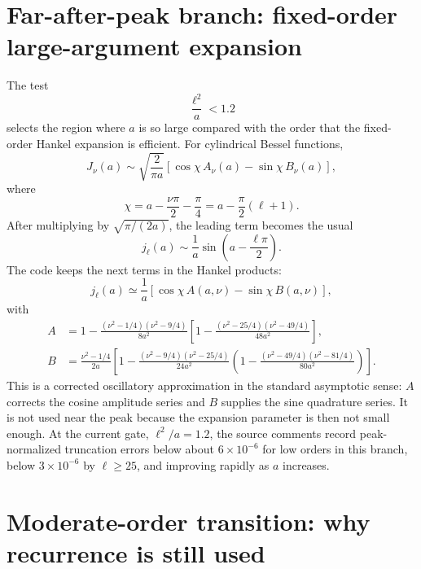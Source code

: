 \documentclass[11pt,a4paper]{article}
\begin{document}
\section{Far-after-peak branch: fixed-order large-argument expansion}

The test
\begin{equation}
  \frac{\ell^2}{a}<1.2
\end{equation}
selects the region where $a$ is so large compared with the order that the fixed-order Hankel expansion is efficient.  For cylindrical Bessel functions,
\begin{equation}
  J_\nu(a)\sim \sqrt{\frac{2}{\pi a}}
  \left[\cos\chi\,A_\nu(a)-\sin\chi\,B_\nu(a)\right],
\end{equation}
where
\begin{equation}
  \chi=a-\frac{\nu\pi}{2}-\frac{\pi}{4}
  = a-\frac{\pi}{2}(\ell+1).
\end{equation}
After multiplying by $\sqrt{\pi/(2a)}$, the leading term becomes the usual
\begin{equation}
  j_\ell(a)\sim \frac{1}{a}\sin\left(a-\frac{\ell\pi}{2}\right).
\end{equation}
The code keeps the next terms in the Hankel products:
\begin{equation}
  j_\ell(a) \simeq \frac{1}{a}\left[\cos\chi\,A(a,\nu)-\sin\chi\,B(a,\nu)\right],
\end{equation}
with
\begin{align}
  A &= 1-\frac{(\nu^2-1/4)(\nu^2-9/4)}{8a^2}
      \left[1-\frac{(\nu^2-25/4)(\nu^2-49/4)}{48a^2}\right], \\
  B &= \frac{\nu^2-1/4}{2a}
      \left[1-\frac{(\nu^2-9/4)(\nu^2-25/4)}{24a^2}
      \left(1-\frac{(\nu^2-49/4)(\nu^2-81/4)}{80a^2}\right)\right].
\end{align}
This is a corrected oscillatory approximation in the standard asymptotic sense: $A$ corrects the cosine amplitude series and $B$ supplies the sine quadrature series.  It is not used near the peak because the expansion parameter is then not small enough.  At the current gate, $\ell^2/a=1.2$, the source comments record peak-normalized truncation errors below about $6\times10^{-6}$ for low orders in this branch, below $3\times10^{-6}$ by $\ell\ge25$, and improving rapidly as $a$ increases.

\section{Moderate-order transition: why recurrence is still used}
\end{document}
